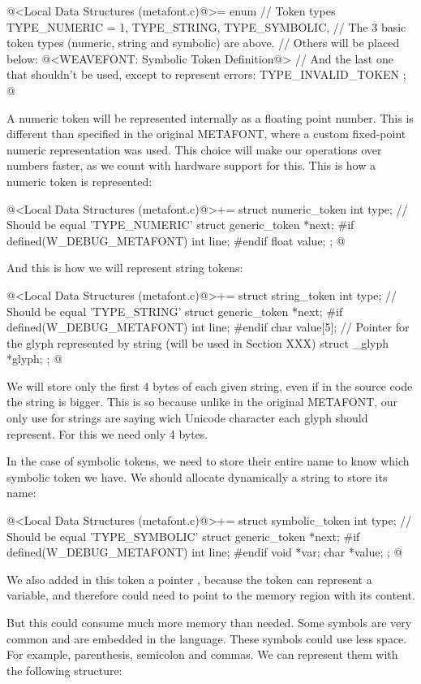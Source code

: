 \iniciocodigo
@<Local Data Structures (metafont.c)@>=
enum { // Token types
  TYPE_NUMERIC = 1, TYPE_STRING, TYPE_SYMBOLIC,
  // The 3 basic token types (numeric, string and symbolic) are above.
  // Others will be placed below:
  @<WEAVEFONT: Symbolic Token Definition@>
  // And the last one that shouldn't be used, except to represent errors:
  TYPE_INVALID_TOKEN
};
@
\fimcodigo

A numeric token will be represented internally as a floating point
number. This is different than specified in the original METAFONT,
where a custom fixed-point numeric representation was used. This
choice will make our operations over numbers faster, as we count with
hardware support for this. This is how a numeric token is represented:

\iniciocodigo
@<Local Data Structures (metafont.c)@>+=
struct numeric_token{
  int type;   // Should be equal 'TYPE_NUMERIC'
  struct generic_token *next;
#if defined(W_DEBUG_METAFONT)
  int line;
#endif
  float value;
};
@
\fimcodigo

And this is how we will represent string tokens:

\iniciocodigo
@<Local Data Structures (metafont.c)@>+=
struct string_token{
  int type;   // Should be equal 'TYPE_STRING'
  struct generic_token *next;
#if defined(W_DEBUG_METAFONT)
  int line;
#endif
  char value[5];
  // Pointer for the glyph represented by string (will be used in Section XXX)
  struct _glyph *glyph;
};
@
\fimcodigo

We will store only the first 4 bytes of each given string, even if in
the source code the string is bigger. This is so because unlike in the
original METAFONT, our only use for strings are saying wich Unicode
character each glyph should represent. For this we need only 4 bytes.

In the case of symbolic tokens, we need to store their entire name to
know which symbolic token we have. We should allocate dynamically
a string to store its name:

\iniciocodigo
@<Local Data Structures (metafont.c)@>+=
struct symbolic_token{
  int type;   // Should be equal 'TYPE_SYMBOLIC'
  struct generic_token *next;
#if defined(W_DEBUG_METAFONT)
  int line;
#endif
  void *var;
  char *value;
};
@
\fimcodigo

We also added in this token a pointer , because the
token can represent a variable, and therefore could need to point to
the memory region with its content.

But this could consume much more memory than needed. Some symbols are
very common and are embedded in the language. These symbols could use
less space. For example, parenthesis, semicolon and commas. We can
represent them with the following structure:

